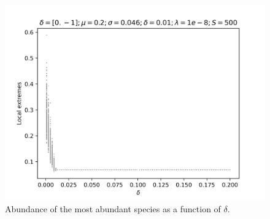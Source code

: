 \documentclass{article}
\begin{document}
\begin{figure}[H]
    \centering
    \includegraphics[width=\linewidth]{Bifurcation/BifurcationM1Delta.png}
    \caption{Abundance of the most abundant species as a function of $\delta$.}
\end{figure}
\clearpage
\end{document}
